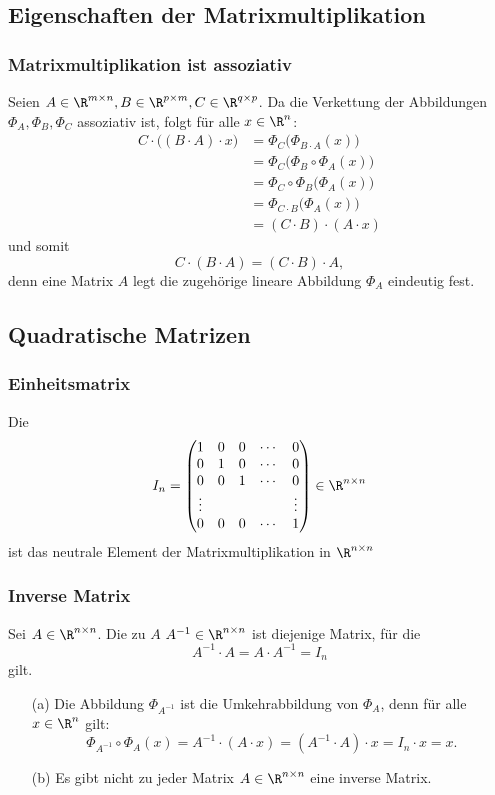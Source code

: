 \subsection{Eigenschaften der Matrixmultiplikation}
\makeSectionDividerPage
%
\begin{frame}\frametitle{Matrixmultiplikation ist assoziativ}

	Seien  $A\in \R^{m\times n}, B \in \R^{p\times m}, C \in \R^{q\times p}$.
	Da die Verkettung der Abbildungen $\Phi_A, \Phi_B, \Phi_C$ assoziativ ist, folgt für alle $x\in \R^n$: 
	\begin{align*}
		C\cdot\big((B\cdot A)\cdot x\big) 
			&= \Phi_C\big( \Phi_{B\cdot A}(x) \big)		\\
			&= \Phi_C\big( \Phi_B\circ\Phi_A(x)\big)	\\
			&= \Phi_C\circ\Phi_B\big(\Phi_A(x)\big)	\\
			&= \Phi_{C\cdot B}\big(\Phi_A(x)\big)		\\
			&= (C\cdot B)\cdot (A\cdot x) 
	\end{align*}
	und somit
	$$
		C\cdot(B\cdot A) = (C\cdot B)\cdot A,
	$$
	denn eine Matrix $A$ legt die zugehörige lineare Abbildung $\Phi_A$ eindeutig fest. 
	
\end{frame}
%
\subsection{Quadratische Matrizen}
\makeSectionDividerPage
%
\begin{frame}\frametitle{Einheitsmatrix}
	
	Die 
	$$
		I_n = 
		\begin{pmatrix}
			1 & 0 & 0 & \cdots & 0 \\
			0 & 1 & 0 & \cdots & 0\\
			0 & 0 & 1 & \cdots & 0\\
			\vdots & & & & \vdots\\
			0 & 0 & 0 & \cdots & 1
		\end{pmatrix} \in \R^{n\times n}
	$$
	ist das neutrale Element der Matrixmultiplikation in $\R^{n\times n}$ 	
	
\end{frame}
%
%
\begin{frame}\frametitle{Inverse Matrix}

	Sei $A\in \R^{n\times n}$.
	Die zu $A$  $A^{-1}\in\R^{n\times n}$ ist diejenige Matrix, für die 
	$$
		A^{-1}\cdot A = A\cdot A^{-1} = I_n
	$$
	gilt.
	\pause
	\vfill
	\begin{itemize}
		\item[(a)] 
			Die Abbildung $\Phi_{A^{-1}}$ ist die Umkehrabbildung von $\Phi_A$,
			denn für alle $x\in \R^n$ gilt:
			$$
				\Phi_{A^{-1}} \circ \Phi_A(x) 
				= A^{-1}\cdot(A\cdot x) 
				= (A^{-1}\cdot A)\cdot x
				= I_n\cdot x
				= x.
			$$\pause
	\item[(b)] Es gibt nicht zu jeder Matrix $A\in\R^{n\times n}$ eine inverse Matrix. 
	\end{itemize}
	
\end{frame}
%
